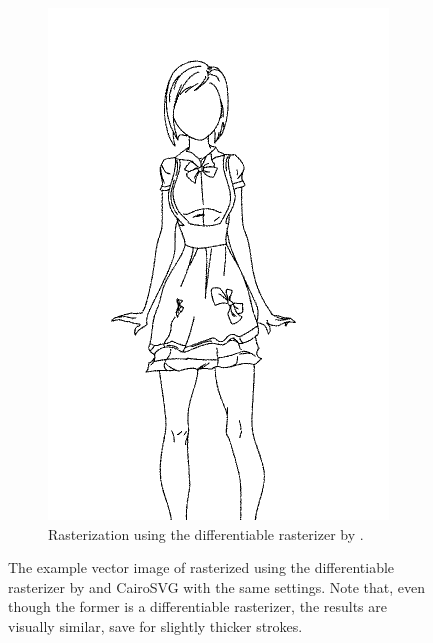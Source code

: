 \begin{figure}
\begin{subfigure}{.45\textwidth}
        \includegraphics[width=\textwidth]{graphics/sketchbench/raster/Art_freeform_AG_03_Branislav Mirkovic_norm_cleaned_diffvg.png}
        \caption{Rasterization using the differentiable rasterizer by \citet{Li:2020:DVG}.}
    \end{subfigure}
    \caption{The example vector image of  rasterized using the differentiable rasterizer by \citet{Li:2020:DVG} and CairoSVG \cite{cairosvg} with the same settings. Note that, even though the former is a differentiable rasterizer, the results are visually similar, save for slightly thicker strokes.}
    \label{fig:rasterization.comparision}
\end{figure}

